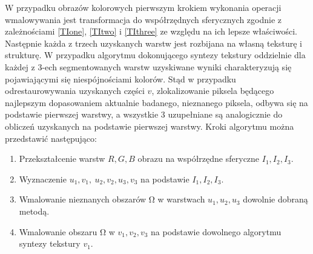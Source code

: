 \documentclass[12pt, twoside, openany]{report}
\theoremstyle{definition}
\begin{document}
W przypadku obrazów kolorowych pierwszym krokiem wykonania operacji wmalowywania jest transformacja do współrzędnych sferycznych zgodnie z zależnościami \eqref{TIone}, \eqref{TItwo} i \eqref{TIthree} ze względu na ich lepsze właściwości. Następnie każda z trzech uzyskanych warstw jest rozbijana na własną teksturę i strukturę. W przypadku algorytmu dokonującego syntezy tekstury oddzielnie dla każdej z 3-ech segmentowanych warstw uzyskiwane wyniki charakteryzują się pojawiającymi się niespójnościami kolorów. Stąd w przypadku odrestaurowywania uzyskanych części $v$, zlokalizowanie piksela będącego najlepszym dopasowaniem aktualnie badanego, nieznanego piksela, odbywa się na podstawie pierwszej warstwy, a wszystkie 3 uzupełniane są analogicznie do obliczeń uzyskanych na podstawie pierwszej warstwy. Kroki algorytmu można przedstawić następująco:
\begin{enumerate}
\item
Przekształcenie warstw $R,G,B$ obrazu na współrzędne sferyczne $I_1,I_2,I_3$.
\item
Wyznaczenie $u_1,v_1,\ u_2,v_2,u_3,v_3$ na podstawie $I_1,I_2,I_3$.
\item
Wmalowanie nieznanych obszarów $\mathrm{\Omega }$ w warstwach $u_1,u_2,u_3$ dowolnie dobraną metodą.
\item
Wmalowanie obszaru $\mathrm{\Omega }$ w $v_1,v_2,v_3$ na podstawie dowolnego algorytmu syntezy tekstury $v_1$.
\end{enumerate}
\end{document}

